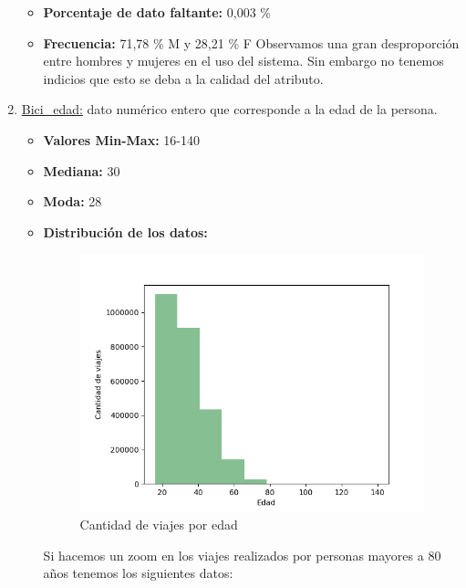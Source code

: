 \begin{enumerate}
\begin{itemize}
            \item \textbf{Porcentaje de dato faltante:} 0,003 \%
            \item \textbf{Frecuencia:} 71,78 \% M y 28,21 \% F
            Observamos una gran desproporción entre hombres y mujeres en el uso del sistema. Sin embargo no tenemos indicios que esto se deba a la calidad del atributo.
        \end{itemize}    
    \item \underline{Bici_edad:} dato numérico entero que corresponde a la edad de la persona.
        \begin{itemize}
            \item \textbf{Valores Min-Max:} 16-140
            \item \textbf{Mediana:} 30
            \item \textbf{Moda:} 28
            \item \textbf{Distribución de los datos:}
\begin{figure}[H]
    \centering
    \includegraphics[scale=0.8]{imagenes/edad.png}
    \caption{Cantidad de viajes por edad}
 \label{fig: cluster}
\end{figure}
Si hacemos un zoom en los viajes realizados por personas mayores a 80 años tenemos los siguientes datos:
\begin{figure}[H]
    \centering

\end{figure}
\end{itemize}
\end{enumerate}
